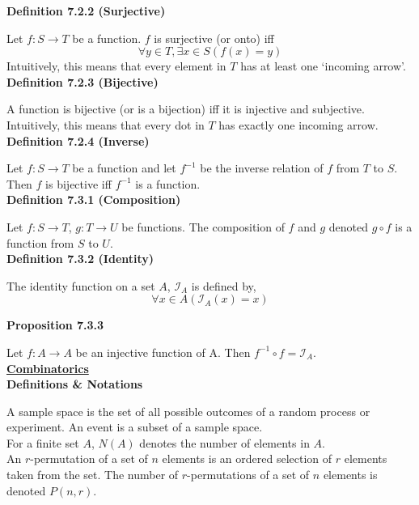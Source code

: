 \documentclass[a4paper]{article}
\newcommand{\heading}[1]{{\small\underline{\textbf{#1}}}}
\newcommand{\subheading}[1]{{\scriptsize\textbf{#1}}}
\begin{document}
\begin{multicols*}{4}
\subheading{Definition 7.2.2 (Surjective)}

Let $f : S \rightarrow T$ be a function. $f$ is surjective (or onto) iff
$$\forall y \in T, \exists x \in S (f(x) = y)$$
Intuitively, this means that every element in $T$ has at least one `incoming
arrow'.\\

\subheading{Definition 7.2.3 (Bijective)}

A function is bijective (or is a bijection) iff it is injective and
subjective. Intuitively, this means that every dot in $T$ has exactly one
incoming arrow.\\

\subheading{Definition 7.2.4 (Inverse)}

Let $f : S \rightarrow T$ be a function and let $f^{-1}$ be the inverse relation
of $f$ from $T$ to $S$. Then $f$ is bijective iff $f^{-1}$ is a function.\\

\subheading{Definition 7.3.1 (Composition)}

Let $f : S \rightarrow T$, $g: T \rightarrow U$ be functions. The composition of
$f$ and $g$ denoted $g \circ f$ is a function from $S$ to $U$.\\

\subheading{Definition 7.3.2 (Identity)}

The identity function on a set $A$, $\mathcal{I}_A$ is defined by,
$$\forall x \in A(\mathcal{I}_A(x) = x)$$

\subheading{Proposition 7.3.3}

Let $f : A \rightarrow A$ be an injective function of A. Then $f^{-1} \circ f =
\mathcal{I}_A$.\\

\heading{Combinatorics}\\

\subheading{Definitions \& Notations}

A sample space is the set of all possible outcomes of a random process or
experiment. An event is a subset of a sample space.\\

For a finite set $A$, $N(A)$ denotes the number of elements in $A$.\\

An $r$-permutation of a set of $n$ elements is an ordered selection of $r$
elements taken from the set. The number of $r$-permutations of a set of $n$
elements is denoted $P(n, r)$.\\


\end{multicols*}
\end{document}

